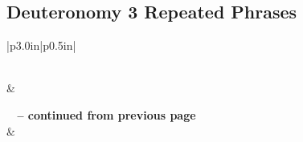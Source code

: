 \subsection{Deuteronomy 3 Repeated Phrases}


\normalsize
 
\begin{center}
\begin{longtable}{|p{3.0in}|p{0.5in}|}
\caption[Deuteronomy 3 Repeated Phrases]{Deuteronomy 3 Repeated Phrases}\label{table:Repeated Phrases Deuteronomy 3} \\
\hline {} &  \\ \hline 
\endfirsthead
 
{{\bfseries \tablename\ \thetable{} -- continued from previous page}} \\  
\hline {} &  \\ \hline 
\endhead
 

\end{longtable}
\end{center}

